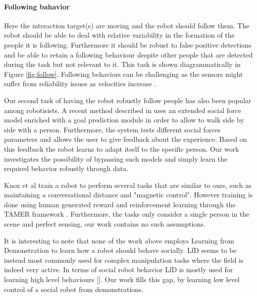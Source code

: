\documentclass[letterpaper, 10 pt, conference]{ieeeconf}
\begin{document}
\begin{figure}[tbh]
    \vspace{-2mm}

  \label{fig:behaviors}
  \end{figure}

\paragraph{Following bahavior} Here the interaction target(s) are moving and the robot should follow them. The robot should be able to deal with relative variability in the formation of the people it is following. Furthermore it should be robust to false positive detections and be able to retain a following behaviour despite other people that are detected during the task but not relevant to it. This task is shown diagrammatically in Figure \ref{fig:follow}. Following behaviors can be challenging as the sensors might suffer from reliability issues as velocities increase \cite{kobilarov2006people}.

Our second task of having the robot robustly follow people has also been popular among robotisists. A recent method described in \cite{ferrer2016robot} uses an extended social force model enriched with a goal prediction module in order to allow to walk side by side with a person. Furthermore, the system tests different social forces parameters and allows the user to give feedback about the experience. Based on this feedback the robot learns to adapt itself to the specific person.  Our work investigates the possibility of bypassing such models and simply learn the required behavior robustly through data.  

Knox et al \cite{knox2013training} train a robot to perform several tasks that are similar to ours, such as maintaining a conversational distance and "magnetic control". However training is done using human generated reward and reinforcement learning through the TAMER framework \cite{knox2009interactively}. Furthermore, the tasks only consider a single person in the scene and perfect sensing, our work contains no such assumptions.

It is interesting to note that none of the work above employs Learning from Demonstration to learn how a robot should behave socially. LfD seems to be instead most commonly used for complex manipulation tasks \cite{argall2009survey} where the field is indeed very active. In terms of social robot behavior LfD is mostly used for learning high level behaviours []. Our work fills this gap, by learning low level control of a social robot from demonstrations.
\end{document}

